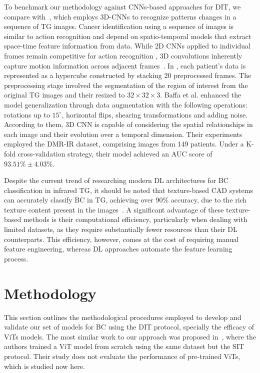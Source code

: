 \documentclass[runningheads]{llncs}
\begin{document}
To benchmark our methodology against \ac{CNNs}-based approaches for
\ac{DIT}, we compare with~\cite{DeMatheus2023}, which employs
3D-\ac{CNNs} to recognize patterns changes in a sequence of \ac{TG}
images. Cancer identification using a sequence of images is similar to
action recognition and depend on spatio-temporal models that extract
space-time feature information from data. While 2D \ac{CNNs} applied
to individual frames remain competitive for action recognition
\cite{Tran2017}, 3D convolutions inherently capture motion information
across adjacent frames~\cite{Ji2013,Qiming2023}. In
\cite{DeMatheus2023}, each patient's data is represented as a
hypercube constructed by stacking 20 preprocessed frames. The
preprocessing stage involved the segmentation of the region of interest
from the original \ac{TG} images and their resized to
$32 \times 32\times 3$. Baffa et al. enhanced the model generalization
through data augmentation with the following operations: rotations up
to $15^\circ$, horizontal flips, shearing transformations and adding
noise. According to them, 3D CNN is capable of considering the spatial
relationships in each image and their evolution over a temporal
dimension. Their experiments employed the DMR-IR dataset, comprising
 images from 149 patients. Under a K-fold
cross-validation strategy, their model achieved an \ac{AUC} score of
\(93.51\% \pm 4.03\%\).

Despite the current trend of researching modern \ac{DL} architectures
for \ac{BC} classification in infrared \ac{TG}, it should be noted
that texture-based \ac{CAD} systems can accurately classify \ac{BC} in
\ac{TG}, achieving over 90\% accuracy, due to the rich texture content
present in the images~\cite{Ryan2025}. A significant advantage of
these texture-based methods is their computational efficiency,
particularly when dealing with limited datasets, as they require
substantially fewer resources than their \ac{DL} counterparts. This
efficiency, however, comes at the cost of requiring manual feature
engineering, whereas \ac{DL} approaches automate the feature learning
process.

\section{Methodology}
\label{sec:methodology}

This section outlines the methodological procedures employed to
develop and validate our set of models for \ac{BC} using the \ac{DIT}
protocol, specially the efficacy of \ac{ViTs} models. The most similar
work to our approach was proposed in~\cite{Garia2023}, where the
authors trained a \ac{ViT} model from scratch using the same dataset
but the \ac{SIT} protocol. Their study does not evaluate the
performance of pre-trained \ac{ViTs}, which is studied now here.
\end{document}
